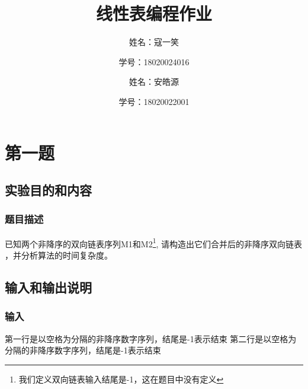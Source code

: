 \documentclass[UTF8]{ctexart}
\title{线性表编程作业}
\author{姓名：寇一笑 \\
\and 学号：18020024016\\
\and 姓名：安皓源 \\
\and 学号：18020022001\\
}
\begin{document}
	\maketitle
	\renewcommand{\contentsname}{Contents}
	\tableofcontents
	\newpage
	
	\hypersetup{
	bookmarks=true,
	colorlinks=true,
	linkcolor=red,
	urlcolor=blue
	}
\section{第一题}
	\subsection{实验目的和内容}
	\subsubsection{题目描述}
    已知两个非降序的双向链表序列M1和M2\footnote{我们定义双向链表输入结尾是-1，这在题目中没有定义}, 请构造出它们合并后的非降序双向链表 ，并分析算法的时间复杂度。


\subsection{输入和输出说明}
	\subsubsection{输入}
    \indent 第一行是以空格为分隔的非降序数字序列，结尾是-1表示结束
    \indent 第二行是以空格为分隔的非降序数字序列，结尾是-1表示结束


\end{document}
